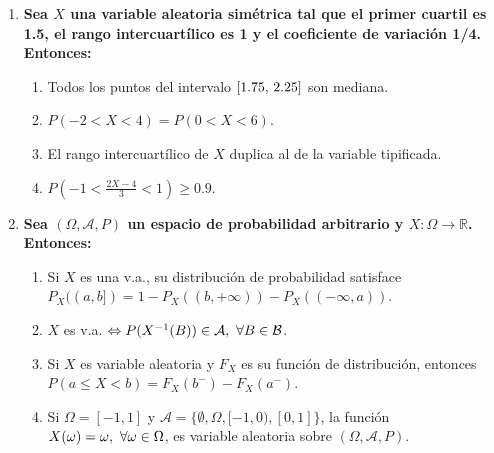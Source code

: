 \documentclass[fleqn]{article}
\def\R{\mathds{R}}
\def\s{\thinspace}
\def\ss{\thinspace \thinspace}
\begin{document}
\begin{enumerate}
\begin{enumerate}
                        \newpage
                                \item \textbf{Sea $X$ una variable aleatoria simétrica tal que el primer cuartil es 1.5, el rango intercuartílico
                                        es 1 y el coeficiente de variación 1/4. Entonces:}
                                        \begin{enumerate}
                                                \item Todos los puntos del intervalo $[1.75, \s 2.25]$ son mediana.
                                                \item $P(-2 < X < 4) = P(0 < X < 6)$.
                                                \item El rango intercuartílico de $X$ duplica al de la variable tipificada.
                                                \item $P \left(-1 < \frac{2X - 4}{3} < 1 \right) \geq 0.9$.
                                        \end{enumerate}       
                                
                                \item \textbf{Sea $(\Omega, \mathcal{A}, P)$ un espacio de probabilidad arbitrario y $X: \Omega \rightarrow \R$. Entonces:}
                                        \begin{enumerate}
                                                \item Si $X$ es una v.a., su distribución de probabilidad satisface 
                                                        $P_X((a,b]) = 1 - P_X((b, +\infty)) - P_X((-\infty, a))$.
                                                \item $X$ es v.a. $\Leftrightarrow P(X^{-1}(B)) \in \mathcal{A}, \ss \forall B \in \mathcal{B}$.
                                                \item Si $X$ es variable aleatoria y $F_X$ es su función de distribución, entonces 
                                                        $P(a\leq X < b) = F_X(b^{-})-F_X(a^{-})$.
                                                \item Si $\Omega = [-1,1]$ y $\mathcal{A} = \{\emptyset, \Omega, [-1, 0), [0, 1]\}$, la función 
                                                $X(\omega) = \omega, \ss \forall \omega \in \Omega$, es variable aleatoria sobre $(\Omega, \mathcal{A}, P)$.
                                        \end{enumerate}
                        \end{enumerate}


\end{enumerate}
\end{document}
